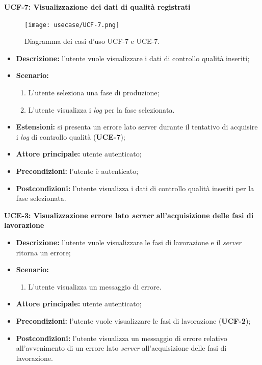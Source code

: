         \textbf{UCF-7: Visualizzazione dei dati di qualità registrati}
        \begin{figure}[H]
            \centering
            \texttt{[image: usecase/UCF-7.png]}
            \caption{Diagramma dei casi d'uso UCF-7 e UCE-7.}
        \end{figure}
        \begin{itemize}
            \item \textbf{Descrizione:} l’utente vuole visualizzare i dati di controllo qualità inseriti;
            \item \textbf{Scenario:}
                \begin{enumerate}
                    \item L’utente seleziona una fase di produzione;
                    \item L’utente visualizza i \textit{log} per la fase selezionata.
                \end{enumerate}
            \item \textbf{Estensioni:} si presenta un errore lato server durante il tentativo di acquisire i \textit{log} di controllo qualità (\textbf{UCE-7});
            \item \textbf{Attore principale:} utente autenticato;
            \item \textbf{Precondizioni:} l’utente è autenticato;
            \item \textbf{Postcondizioni:} l’utente visualizza i dati di controllo qualità inseriti per la fase selezionata.
        \end{itemize}

        \textbf{UCE-3: Visualizzazione errore lato \textit{server} all’acquisizione delle fasi di lavorazione}
        \begin{itemize}
            \item \textbf{Descrizione:} l’utente vuole visualizzare le fasi di lavorazione e il \textit{server} ritorna un errore;
            \item \textbf{Scenario:}
                \begin{enumerate}
                    \item L’utente visualizza un messaggio di errore.
                \end{enumerate}
            \item \textbf{Attore principale:} utente autenticato;
            \item \textbf{Precondizioni:} l’utente vuole visualizzare le fasi di lavorazione (\textbf{UCF-2});
            \item \textbf{Postcondizioni:} l’utente visualizza un messaggio di errore relativo all’avvenimento di un errore lato \textit{server} all’acquisizione delle fasi di lavorazione.
        \end{itemize}

